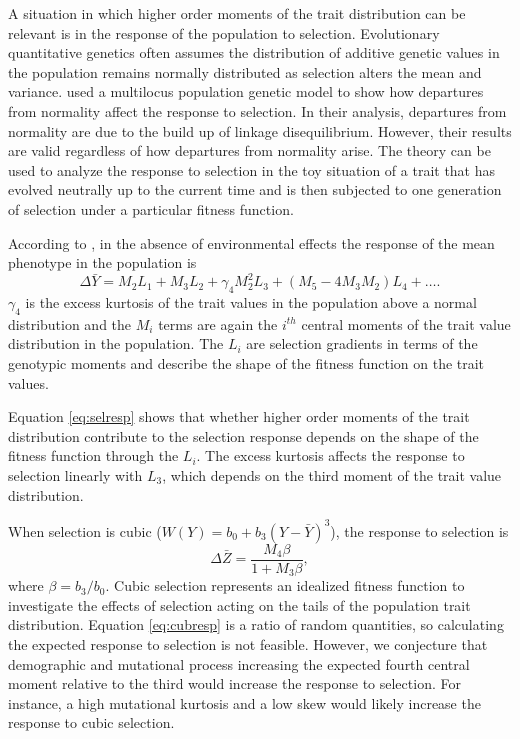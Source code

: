 A situation in which higher order moments of the trait distribution can be
relevant is in the response of the population to selection. Evolutionary
quantitative genetics often assumes the distribution of additive genetic values
in the population remains normally distributed as selection alters the mean and
variance. \citet{Turelli1990} used a multilocus population genetic model to show
how departures from normality affect the response to selection. In their
analysis, departures from normality are due to the build up of linkage
disequilibrium. However, their results are valid regardless of how departures
from normality arise. The \citet{Turelli1990} theory can be used to analyze the
response to selection in the toy situation of a trait that has evolved neutrally
up to the current time and is then subjected to one generation of selection
under a particular fitness function.

According to \citet{Turelli1990}, in the absence of environmental effects the
response of the mean phenotype in the population is
\begin{equation}
  \label{eq:selresp}
  \Delta \bar{Y} = M_2L_1 + M_3L_2 + \gamma_4M^2_2L_3 +
  \left( M_5-4M_3M_2\right)L_4 + \ldots.
\end{equation}
$\gamma_4$ is the excess kurtosis of the trait values in the population above a
normal distribution and the $M_i$ terms are again the $i^{th}$ central moments
of the trait value distribution in the population. The $L_i$ are selection
gradients in terms of the genotypic moments and describe the shape of the
fitness function on the trait values.

Equation \eqref{eq:selresp} shows that whether higher order moments of the trait
distribution contribute to the selection response depends on the shape of the
fitness function through the $L_i$. The excess kurtosis affects the response to
selection linearly with $L_3$, which depends on the third moment of the trait
value distribution.

When selection is cubic ($W(Y) = b_0 + b_3(Y-\bar{Y})^3$), the response to
selection is
\begin{equation}
  \label{eq:cubresp}
  \Delta \bar{Z} = \frac{M_4\beta}{1 + M_3\beta},
\end{equation}
where $\beta=b_3/b_0$. Cubic selection represents an idealized fitness function
to investigate the effects of selection acting on the tails of the population
trait distribution. Equation \eqref{eq:cubresp} is a ratio of random quantities,
so calculating the expected response to selection is not feasible. However, we
conjecture that demographic and mutational process increasing the expected
fourth central moment relative to the third would increase the response to
selection. For instance, a high mutational kurtosis and a low skew would likely
increase the response to cubic selection.

